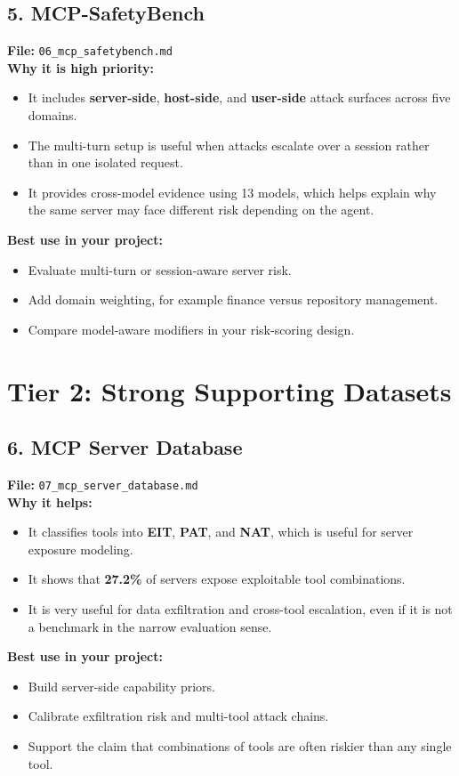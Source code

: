 \documentclass[11pt]{article}
\begin{document}
\subsection*{5. MCP-SafetyBench}
\textbf{File:} \texttt{06\_mcp\_safetybench.md} \\
\textbf{Why it is high priority:}
\begin{itemize}[leftmargin=1.2em]
\item It includes \textbf{server-side}, \textbf{host-side}, and \textbf{user-side} attack surfaces across five domains.
\item The multi-turn setup is useful when attacks escalate over a session rather than in one isolated request.
\item It provides cross-model evidence using 13 models, which helps explain why the same server may face different risk depending on the agent.
\end{itemize}
\textbf{Best use in your project:}
\begin{itemize}[leftmargin=1.2em]
\item Evaluate multi-turn or session-aware server risk.
\item Add domain weighting, for example finance versus repository management.
\item Compare model-aware modifiers in your risk-scoring design.
\end{itemize}

\section*{Tier 2: Strong Supporting Datasets}

\subsection*{6. MCP Server Database}
\textbf{File:} \texttt{07\_mcp\_server\_database.md} \\
\textbf{Why it helps:}
\begin{itemize}[leftmargin=1.2em]
\item It classifies tools into \textbf{EIT}, \textbf{PAT}, and \textbf{NAT}, which is useful for server exposure modeling.
\item It shows that \textbf{27.2\%} of servers expose exploitable tool combinations.
\item It is very useful for data exfiltration and cross-tool escalation, even if it is not a benchmark in the narrow evaluation sense.
\end{itemize}
\textbf{Best use in your project:}
\begin{itemize}[leftmargin=1.2em]
\item Build server-side capability priors.
\item Calibrate exfiltration risk and multi-tool attack chains.
\item Support the claim that combinations of tools are often riskier than any single tool.
\end{itemize}
\end{document}
